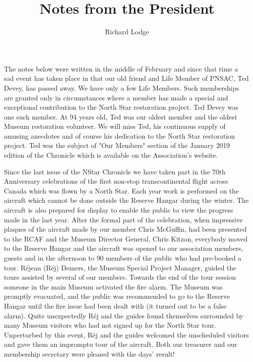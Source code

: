 
%


\title{Notes from the President}
\author{Richard Lodge}

\maketitle

The notes below were written in the middle of February and since that
time a sad event has taken place in that our old friend and Life Member
of PNSAC, Ted Devey, has passed away. We have only a few Life Members.
Such memberships are granted only in circumstances where a member has
made a special and exceptional contribution to the North Star
restoration project. Ted Devey was one such member. At 94 years old,
Ted was our oldest member and the oldest Museum restoration volunteer.
We will miss Ted, his continuous supply of amusing anecdotes and of
course his dedication to the North Star restoration project. Ted was
the subject of "Our Members" section of the January 2019 edition of the
Chronicle which is available on the Association's website.

Since the last issue of the NStar Chronicle we have taken part in the
70th Anniversary celebrations of the first non-stop transcontinental
flight across Canada which was flown by a North Star. Each year work is
performed on the aircraft which cannot be done outside the Reserve Hangar
during the winter. The aircraft is also prepared for display to enable the
public to view the progress made in the last year. After the
formal part of the celebration, when impressive plaques of the aircraft
made by our member Chris McGuffin, had been presented to the RCAF and
the Museum Director General, Chris Kitzan, everybody moved to the
Reserve Hangar and the aircraft was opened to our association members,
guests and in the afternoon to 90 members of the public who had
pre-booked a tour. R\'{e}jean (R\'{e}j) Demers, the Museum Special Project
Manager, guided the tours assisted by several of our members. Towards
the end of the tour session someone in the main Museum activated the
fire alarm. The Museum was promptly evacuated, and the public was
recommended to go to the Reserve  Hangar until the fire issue had been
dealt with (it turned out to be a false alarm). Quite unexpectedly R\'{e}j
and the guides found themselves surrounded by many Museum visitors who
had not signed up for the North Star tour. Unperturbed by this event,
R\'{e}j and the guides welcomed the unscheduled visitors and gave them an
impromptu tour of the aircraft. Both our treasurer and our membership
secretary were pleased with the days' result!

